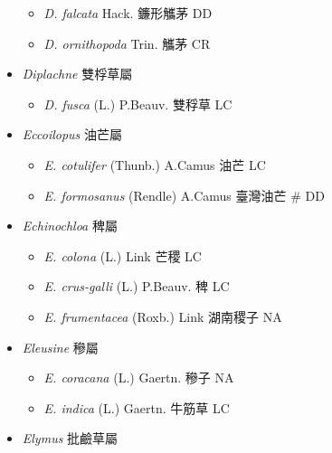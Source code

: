 \begin{itemize}
  \begin{itemize}
        \item[] \textit{D. falcata} Hack.  鐮形觿茅   DD
        \item[] \textit{D. ornithopoda} Trin.  觿茅   CR
  \end{itemize}
 \item[] \textit{Diplachne} 雙桴草屬
                                
  \begin{itemize}
        \item[] \textit{D. fusca} (L.) P.Beauv.  雙稃草   LC
  \end{itemize}
 \item[] \textit{Eccoilopus} 油芒屬
                                
  \begin{itemize}
        \item[] \textit{E. cotulifer} (Thunb.) A.Camus  油芒   LC
        \item[] \textit{E. formosanus} (Rendle) A.Camus  臺灣油芒  \# DD
  \end{itemize}
 \item[] \textit{Echinochloa} 稗屬
                                
  \begin{itemize}
        \item[] \textit{E. colona} (L.) Link  芒稷   LC
        \item[] \textit{E. crus-galli} (L.) P.Beauv.  稗   LC
        \item[] \textit{E. frumentacea} (Roxb.) Link  湖南稷子   NA
  \end{itemize}
 \item[] \textit{Eleusine} 穇屬
                                
  \begin{itemize}
        \item[] \textit{E. coracana} (L.) Gaertn.  穇子   NA
        \item[] \textit{E. indica} (L.) Gaertn.  牛筋草   LC
  \end{itemize}
 \item[] \textit{Elymus} 批鹼草屬
                                

\end{itemize}
